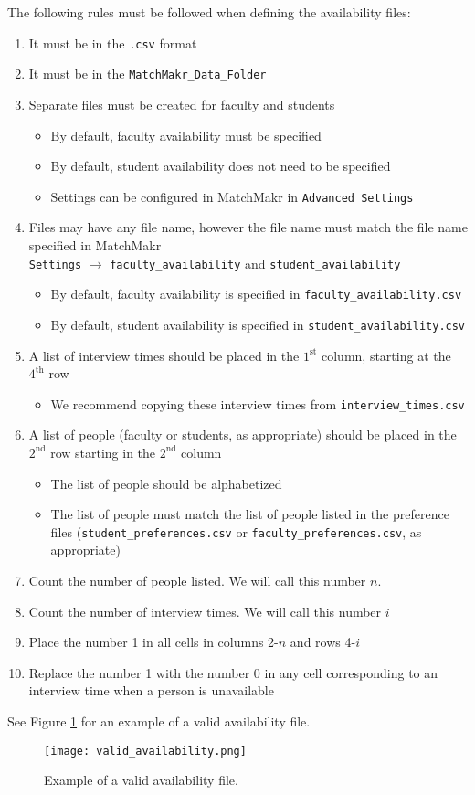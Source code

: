 The following rules must be followed when defining the availability files:
\begin{enumerate}
	\item It must be in the \texttt{.csv} format
	\item It must be in the \texttt{MatchMakr\_Data\_Folder}
	\item Separate files must be created for faculty and students
		\begin{itemize}
			\item By default, faculty availability must be specified
			\item By default, student availability does not need to be specified
			\item Settings can be configured in MatchMakr in \texttt{Advanced Settings}
		\end{itemize}
	\item Files may have any file name, however the file name must match the file name specified in MatchMakr \\ \texttt{Settings} $\rightarrow$ \texttt{faculty\_availability} and \texttt{student\_availability} 
		\begin{itemize}
			\item By default, faculty availability is specified in \texttt{faculty\_availability.csv}
			\item By default, student availability is specified in \texttt{student\_availability.csv}
		\end{itemize}
	\item A list of interview times should be placed in the $1^\text{st}$ column, starting at the $4^\text{th}$ row
		\begin{itemize}
			\item We recommend copying these interview times from \texttt{interview\_times.csv} 
		\end{itemize}
	\item A list of people (faculty or students, as appropriate) should be placed in the $2^\text{nd}$ row starting in the $2^\text{nd}$ column
		\begin{itemize}
			\item The list of people should be alphabetized
			\item The list of people must match the list of people listed in the preference files (\texttt{student\_preferences.csv} or \texttt{faculty\_preferences.csv}, as appropriate)
		\end{itemize}
	\item Count the number of people listed.  We will call this number $n$.
	\item Count the number of interview times.  We will call this number $i$
	\item Place the number 1 in all cells in columns 2-$n$ and rows 4-$i$
	\item Replace the number 1 with the number 0 in any cell corresponding to an interview time when a person is unavailable
\end{enumerate}

See Figure \ref{fig:valid_availability} for an example of a valid availability file.

\begin{figure}
	\centering
	\texttt{[image: valid\_availability.png]}
	\caption{\label{fig:valid_availability} Example of a valid availability file.}
\end{figure}

